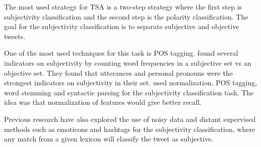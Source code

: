 The most used strategy for TSA is a two-step strategy where the first step is subjectivity classification and the second step is the polarity classification. The goal for the subjectivity classification is to separate subjective and objective tweets.

One of the most used techniques for this task is POS tagging. \cite{article:pak} found several indicators on subjectivity by counting word frequencies in a subjective set vs an objective set. They found that utterances and personal pronouns were the strongest indicators on subjectivity in their set. \cite{article:jiang} used normalization, POS tagging, word stemming and syntactic parsing for the subjectivity classification task. The idea was that normalization of features would give better recall.

Previous research have also explored the use of noisy data and distant supervised methods such as emoticons and hashtags for the subjectivity classification, where any match from a given lexicon will classify the tweet as subjective.